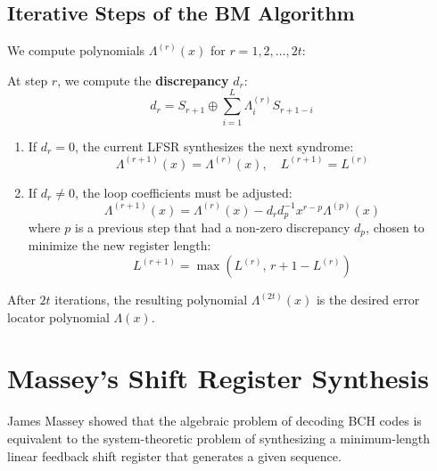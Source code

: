 \documentclass[12pt,a4paper]{article}
\begin{document}
\subsection{Iterative Steps of the BM Algorithm}
We compute polynomials $\Lambda^{(r)}(x)$ for $r = 1, 2, \dots, 2t$:
\begin{tcolorbox}[formulabox, title={\textbf{Berlekamp-Massey Iteration}}]
At step $r$, we compute the \textbf{discrepancy} $d_r$:
\[ d_r = S_{r+1} \oplus \sum_{i=1}^L \Lambda_i^{(r)} S_{r+1-i} \]
\begin{enumerate}[leftmargin=*, itemsep=3pt, topsep=0pt]
  \item If $d_r = 0$, the current LFSR synthesizes the next syndrome:
    \[ \Lambda^{(r+1)}(x) = \Lambda^{(r)}(x), \quad L^{(r+1)} = L^{(r)} \]
  \item If $d_r \neq 0$, the loop coefficients must be adjusted:
    \[ \Lambda^{(r+1)}(x) = \Lambda^{(r)}(x) - d_r d_p^{-1} x^{r-p} \Lambda^{(p)}(x) \]
    where $p$ is a previous step that had a non-zero discrepancy $d_p$, chosen to minimize the new register length:
    \[ L^{(r+1)} = \max \left( L^{(r)}, \, r + 1 - L^{(r)} \right) \]
\end{enumerate}
\end{tcolorbox}
After $2t$ iterations, the resulting polynomial $\Lambda^{(2t)}(x)$ is the desired error locator polynomial $\Lambda(x)$.

\section{Massey's Shift Register Synthesis}

James Massey showed that the algebraic problem of decoding BCH codes is equivalent to the system-theoretic problem of synthesizing a minimum-length linear feedback shift register that generates a given sequence.
\end{document}
